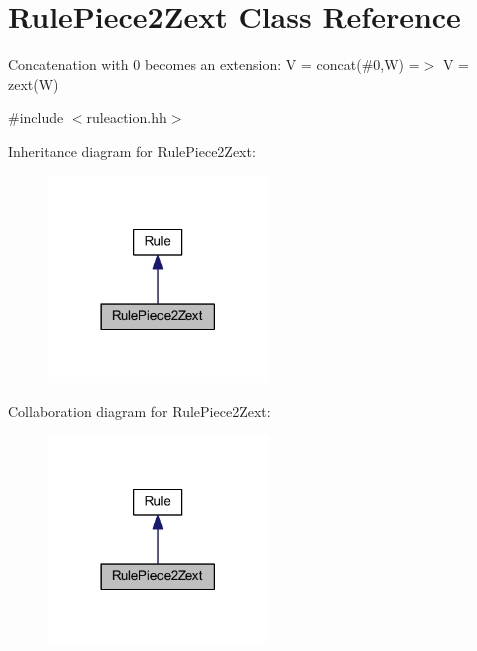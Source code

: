 \hypertarget{class_rule_piece2_zext}{}\section{Rule\+Piece2\+Zext Class Reference}
\label{class_rule_piece2_zext}


Concatenation with 0 becomes an extension\+: {\ttfamily V = concat(\#0,W) =$>$ V = zext(\+W)}  




{\ttfamily \#include $<$ruleaction.\+hh$>$}



Inheritance diagram for Rule\+Piece2\+Zext\+:
\nopagebreak
\begin{figure}[H]
\begin{center}
\leavevmode
\includegraphics[width=165pt]{class_rule_piece2_zext__inherit__graph}
\end{center}
\end{figure}


Collaboration diagram for Rule\+Piece2\+Zext\+:
\nopagebreak
\begin{figure}[H]
\begin{center}
\leavevmode
\includegraphics[width=165pt]{class_rule_piece2_zext__coll__graph}
\end{center}
\end{figure}

